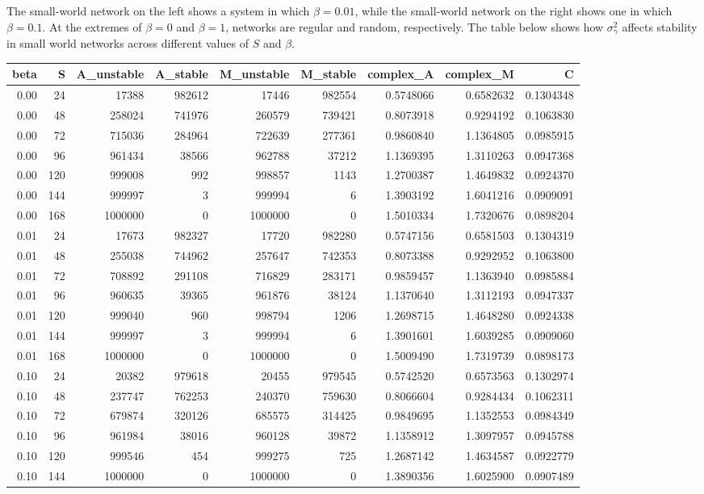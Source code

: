 \documentclass[]{article}
\begin{document}
\vspace{2mm}

The small-world network on the left shows a system in which
\(\beta = 0.01\), while the small-world network on the right shows one
in which \(\beta = 0.1\). At the extremes of \(\beta = 0\) and
\(\beta = 1\), networks are regular and random, respectively. The table
below shows how \(\sigma^{2}_\gamma\) affects stability in small world
networks across different values of \(S\) and \(\beta\).

\begin{longtable}[]{@{}rrrrrrrrr@{}}
\toprule
beta & S & A\_unstable & A\_stable & M\_unstable & M\_stable &
complex\_A & complex\_M & C\tabularnewline
\midrule
\endhead
0.00 & 24 & 17388 & 982612 & 17446 & 982554 & 0.5748066 & 0.6582632 &
0.1304348\tabularnewline
0.00 & 48 & 258024 & 741976 & 260579 & 739421 & 0.8073918 & 0.9294192 &
0.1063830\tabularnewline
0.00 & 72 & 715036 & 284964 & 722639 & 277361 & 0.9860840 & 1.1364805 &
0.0985915\tabularnewline
0.00 & 96 & 961434 & 38566 & 962788 & 37212 & 1.1369395 & 1.3110263 &
0.0947368\tabularnewline
0.00 & 120 & 999008 & 992 & 998857 & 1143 & 1.2700387 & 1.4649832 &
0.0924370\tabularnewline
0.00 & 144 & 999997 & 3 & 999994 & 6 & 1.3903192 & 1.6041216 &
0.0909091\tabularnewline
0.00 & 168 & 1000000 & 0 & 1000000 & 0 & 1.5010334 & 1.7320676 &
0.0898204\tabularnewline
0.01 & 24 & 17673 & 982327 & 17720 & 982280 & 0.5747156 & 0.6581503 &
0.1304319\tabularnewline
0.01 & 48 & 255038 & 744962 & 257647 & 742353 & 0.8073388 & 0.9292952 &
0.1063800\tabularnewline
0.01 & 72 & 708892 & 291108 & 716829 & 283171 & 0.9859457 & 1.1363940 &
0.0985884\tabularnewline
0.01 & 96 & 960635 & 39365 & 961876 & 38124 & 1.1370640 & 1.3112193 &
0.0947337\tabularnewline
0.01 & 120 & 999040 & 960 & 998794 & 1206 & 1.2698715 & 1.4648280 &
0.0924338\tabularnewline
0.01 & 144 & 999997 & 3 & 999994 & 6 & 1.3901601 & 1.6039285 &
0.0909060\tabularnewline
0.01 & 168 & 1000000 & 0 & 1000000 & 0 & 1.5009490 & 1.7319739 &
0.0898173\tabularnewline
0.10 & 24 & 20382 & 979618 & 20455 & 979545 & 0.5742520 & 0.6573563 &
0.1302974\tabularnewline
0.10 & 48 & 237747 & 762253 & 240370 & 759630 & 0.8066604 & 0.9284434 &
0.1062311\tabularnewline
0.10 & 72 & 679874 & 320126 & 685575 & 314425 & 0.9849695 & 1.1352553 &
0.0984349\tabularnewline
0.10 & 96 & 961984 & 38016 & 960128 & 39872 & 1.1358912 & 1.3097957 &
0.0945788\tabularnewline
0.10 & 120 & 999546 & 454 & 999275 & 725 & 1.2687142 & 1.4634587 &
0.0922779\tabularnewline
0.10 & 144 & 1000000 & 0 & 1000000 & 0 & 1.3890356 & 1.6025900 &
0.0907489\tabularnewline

\end{longtable}
\end{document}
